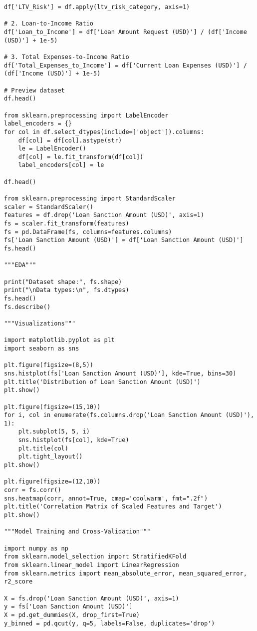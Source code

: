\documentclass[11pt]{article}
\begin{document}
\begin{lstlisting}[style=python]
df['LTV_Risk'] = df.apply(ltv_risk_category, axis=1)

# 2. Loan-to-Income Ratio
df['Loan_to_Income'] = df['Loan Amount Request (USD)'] / (df['Income (USD)'] + 1e-5)

# 3. Total Expenses-to-Income Ratio
df['Total_Expenses_to_Income'] = df['Current Loan Expenses (USD)'] / (df['Income (USD)'] + 1e-5)

# Preview dataset
df.head()

from sklearn.preprocessing import LabelEncoder
label_encoders = {}
for col in df.select_dtypes(include=['object']).columns:
    df[col] = df[col].astype(str)
    le = LabelEncoder()
    df[col] = le.fit_transform(df[col])
    label_encoders[col] = le

df.head()

from sklearn.preprocessing import StandardScaler
scaler = StandardScaler()
features = df.drop('Loan Sanction Amount (USD)', axis=1)
fs = scaler.fit_transform(features)
fs = pd.DataFrame(fs, columns=features.columns)
fs['Loan Sanction Amount (USD)'] = df['Loan Sanction Amount (USD)']
fs.head()

"""EDA"""

print("Dataset shape:", fs.shape)
print("\nData types:\n", fs.dtypes)
fs.head()
fs.describe()

"""Visualizations"""

import matplotlib.pyplot as plt
import seaborn as sns

plt.figure(figsize=(8,5))
sns.histplot(fs['Loan Sanction Amount (USD)'], kde=True, bins=30)
plt.title('Distribution of Loan Sanction Amount (USD)')
plt.show()

plt.figure(figsize=(15,10))
for i, col in enumerate(fs.columns.drop('Loan Sanction Amount (USD)'), 1):
    plt.subplot(5, 5, i)
    sns.histplot(fs[col], kde=True)
    plt.title(col)
    plt.tight_layout()
plt.show()

plt.figure(figsize=(12,10))
corr = fs.corr()
sns.heatmap(corr, annot=True, cmap='coolwarm', fmt=".2f")
plt.title('Correlation Matrix of Scaled Features and Target')
plt.show()

"""Model Training and Cross-Validation"""

import numpy as np
from sklearn.model_selection import StratifiedKFold
from sklearn.linear_model import LinearRegression
from sklearn.metrics import mean_absolute_error, mean_squared_error, r2_score

X = fs.drop('Loan Sanction Amount (USD)', axis=1)
y = fs['Loan Sanction Amount (USD)']
X = pd.get_dummies(X, drop_first=True)
y_binned = pd.qcut(y, q=5, labels=False, duplicates='drop')


\end{lstlisting}
\end{document}
